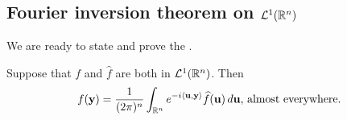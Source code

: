 \subsection{Fourier inversion theorem on ${\mathcal {L}^1}({\mathbb R}^n)$}

We are ready to state and prove the .

\begin{theorem}
\label{thm:fourier:inversionlone}
Suppose that $f$ and $\widehat{f}$ are both in ${\mathcal {L}^1}({\mathbb R}^n)$. Then \begin{align*}
    f(\mathbf{y}) = \frac{1}{(2\pi)^n}\int_{{\mathbb R}^n} e^{-i \langle \mathbf{u}, \mathbf{y}\rangle} \widehat{f}(\mathbf{u}) \,d\mathbf{u} \text{, almost everywhere}.
\end{align*}
\end{theorem}

